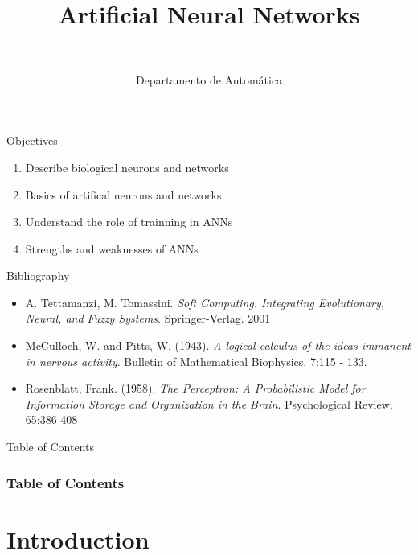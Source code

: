 \documentclass[10pt,compress]{beamer} %
\title[Aritificial Neural Networks]{Artificial Neural Networks}
\author{\asignatura\\\carrera}
\institute{}
\date{Departamento de Automática}
\begin{document}
{\titlepageBlue
    \begin{frame}
        \titlepage
    \end{frame}
}

\institute{\asignatura}

\begin{frame}[plain]{}
   \begin{block}{Objectives}
      \begin{enumerate}
         \item Describe biological neurons and networks
         \item Basics of artifical neurons and networks
         \item Understand the role of trainning in ANNs
         \item Strengths and weaknesses of ANNs
      \end{enumerate} 
   \end{block}

   \begin{block}{Bibliography}
	\begin{itemize}
        \item A. Tettamanzi, M. Tomassini. \textit{Soft Computing. Integrating Evolutionary, Neural, and Fuzzy Systems}. Springer-Verlag. 2001
	    \item McCulloch, W. and Pitts, W. (1943). \textit{A logical calculus of the ideas immanent in nervous activity}. Bulletin of Mathematical Biophysics, 7:115 - 133. 
	    \item Rosenblatt, Frank.  (1958). \textit{The Perceptron: A Probabilistic Model for Information Storage and Organization in the Brain}. Psychological Review, 65:386-408
	\end{itemize}
   \end{block}
\end{frame}

{
\begin{frame}[shrink]{Table of Contents}
 \frametitle{Table of Contents}

    \begin{multicols}{2}
    \tableofcontents
    \end{multicols}
\end{frame}
}

\section{Introduction}
\end{document}
